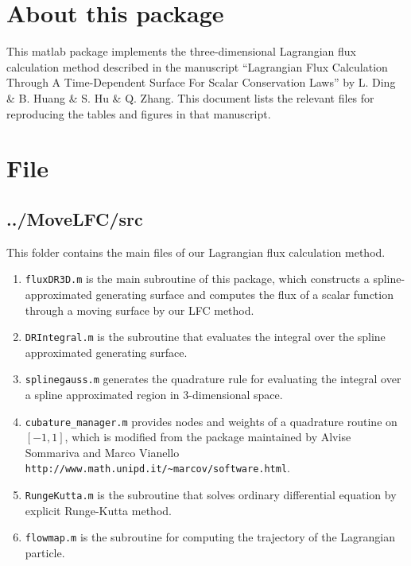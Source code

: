 \documentclass[twoside,a4paper]{article}
\begin{document}
\pagestyle{fancy}
\fancyhead{}
\lhead{ }
\chead{ }
\rhead{}


\section{About this package}

This matlab package implements the three-dimensional Lagrangian flux calculation  method described in the manuscript ``Lagrangian Flux Calculation Through A Time-Dependent Surface For Scalar Conservation Laws'' by  L. Ding \& B. Huang \& S. Hu \& Q. Zhang. This document lists the relevant files for reproducing the tables and figures in that manuscript.

\section{File}

\subsection{../MoveLFC/src}
This folder contains the main files of our Lagrangian flux calculation method.

\begin{enumerate}
\item  \texttt{fluxDR3D.m} is the main subroutine of this package, which constructs a spline-approximated generating surface and computes the flux of a scalar function through a moving surface by our LFC method.

\item \texttt{DRIntegral.m} is the subroutine that evaluates the integral over the spline approximated generating surface.

\item \texttt{splinegauss.m} generates the quadrature rule for evaluating the integral over a spline approximated region in 3-dimensional space. 


\item \texttt{cubature\_manager.m} provides nodes and weights of a quadrature routine on $[-1,1]$, which is modified from the package  maintained by  Alvise Sommariva and Marco Vianello \cite{sommariva2009gauss}   \verb|http://www.math.unipd.it/~marcov/software.html|.

\item \texttt{RungeKutta.m} is the subroutine that solves ordinary differential equation by explicit Runge-Kutta method.



  

\item \texttt{flowmap.m} is the subroutine for computing the trajectory of the Lagrangian particle. 
  
\end{enumerate}
\end{document}
